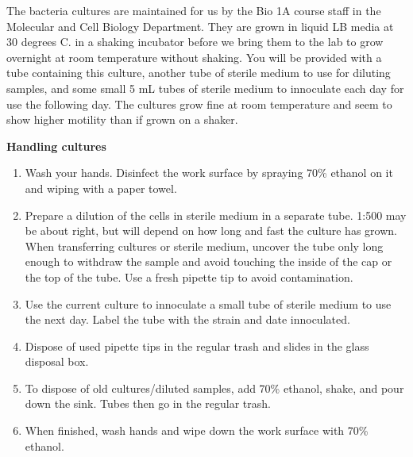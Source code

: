 \documentclass{../lab}
\begin{document}
The bacteria cultures are maintained for us by the Bio 1A course staff in the Molecular and Cell Biology Department. They are grown in liquid LB media at 30 degrees C. in a shaking incubator before we bring them to the lab to grow overnight at room temperature without shaking. You will be provided with a tube containing this culture, another tube of sterile medium to use for diluting samples, and some small 5 mL tubes of sterile medium to innoculate each day for use the following day. The cultures grow fine at room temperature and seem to show higher motility than if grown on a shaker.

\textbf{Handling cultures}\begin{enumerate}
    \item Wash your hands. Disinfect the work surface by spraying 70\% ethanol on it and wiping with a paper towel.

    \item Prepare a dilution of the cells in sterile medium in a separate tube. 1:500 may be about right, but will depend on how long and fast the culture has grown. When transferring cultures or sterile medium, uncover the tube only long enough to withdraw the sample and avoid touching the inside of the cap or the top of the tube. Use a fresh pipette tip to avoid contamination.

    \item Use the current culture to innoculate a small tube of sterile medium to use the next day. Label the tube with the strain and date innoculated.

    \item Dispose of used pipette tips in the regular trash and slides in the glass disposal box.

    \item To dispose of old cultures/diluted samples, add 70\% ethanol, shake, and pour down the sink. Tubes then go in the regular trash.

    \item When finished, wash hands and wipe down the work surface with 70\% ethanol.

\end{enumerate}
\end{document}
